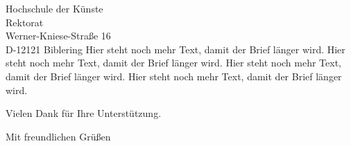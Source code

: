 \documentclass{scrlttr2}
\begin{document}
\begin{letter}{Hochschule der Künste\\
      Rektorat\\
      Werner-Kniese-Straße 16\\
      D-12121 Biblering}
Hier steht noch mehr Text, damit der Brief länger wird.
Hier steht noch mehr Text, damit der Brief länger wird.
Hier steht noch mehr Text, damit der Brief länger wird.
Hier steht noch mehr Text, damit der Brief länger wird.


Vielen Dank für Ihre Unterstützung.

\closing{Mit freundlichen Grüßen}


\end{letter}
\end{document}

